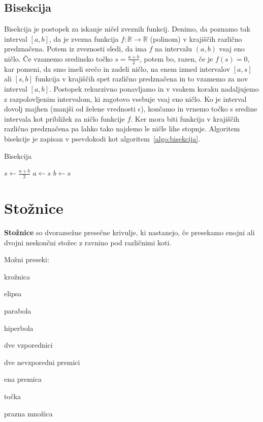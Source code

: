 \documentclass[a4paper,oneside,12pt,fleqn]{article}
\def\R{\ensuremath{\mathbb R}}
\numberwithin{equation}{section}
\newenvironment{itemize*}%
{
\vspace{-12pt}%
\begin{itemize}%
\setlength{\itemsep}{0pt}%
\setlength{\parskip}{2pt}}%
{\end{itemize}}
\begin{document}
\subsection{Bisekcija}
\label{sec:pol:bisekcija}
Bisekcija je postopek za iskanje ničel zveznih funkcij. Denimo, da poznamo tak interval $[a, b]$,
da je zvezna funkcija $f\!: \R \rightarrow \R$ (polinom) v krajiščih različno predznačena.
Potem iz zveznosti sledi, da ima $f$ na intervalu $(a, b)$ vsaj eno ničlo. Če vzamemo sredinsko 
točko $s = \frac{a + b}{2}$, potem bo, razen, če je $f(s) = 0$, kar pomeni, da smo imeli srečo in 
zadeli ničlo, na enem izmed intervalov $[a, s]$ ali $[s, b]$ funkcija v krajiščih spet različno 
predznačena in to vzamemo za nov interval $[a, b]$. Postopek rekurzivno ponavljamo in v vsakem 
koraku nadaljujemo z razpolovljenim intervalom, ki zagotovo vsebuje vsaj eno ničlo. Ko je interval
dovolj majhen (manjši od želene vrednosti $\epsilon$), končamo in vrnemo točko s sredine intervala
kot približek za ničlo funkcije $f$. Ker mora biti funkcija v krajiščih različno
predznačena pa lahko tako najdemo le ničle lihe stopnje.
Algoritem bisekcije je zapisan v psevdokodi kot algoritem~\ref{algo:bisekcija}.

\begin{algorithm}[h!]
  \caption{Bisekcija}\label{algo:bisekcija}
  \begin{algorithmic}[1]
        \State $s \gets \frac{a+b}{2}$
          \State $a \gets s$
        \Else
          \State $b \gets s$
        \EndIf
    \EndWhile
  \end{algorithmic}
\end{algorithm}

\section{Stožnice}
\label{sec:stoz}
\textbf{Stožnice} so dvorazsežne presečne krivulje, ki nastanejo, če presekamo enojni ali dvojni
neskončni stožec z ravnino pod različnimi koti.

Možni preseki:
\begin{itemize*}
  \item krožnica
  \item elipsa
  \item parabola
  \item hiperbola
  \item dve vzporednici
  \item dve nevzporedni premici
  \item ena premica
  \item točka
  \item prazna množica
\end{itemize*}
\end{document}
